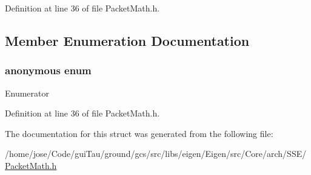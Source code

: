 Definition at line 36 of file Packet\-Math.\-h.



\subsection{Member Enumeration Documentation}
\hypertarget{structei__unpacket__traits_3_01____m128_01_4_aac7f4e6b9de23f90164c838116d0e04e}{\subsubsection[{anonymous enum}]{\setlength{\rightskip}{0pt plus 5cm}anonymous enum}}\label{structei__unpacket__traits_3_01____m128_01_4_aac7f4e6b9de23f90164c838116d0e04e}
\begin{Desc}
\item[Enumerator]\par
\begin{description}
\item[{\em 
\hypertarget{structei__unpacket__traits_3_01____m128_01_4_aac7f4e6b9de23f90164c838116d0e04ea8118586734f1b8635fd65d55aad37fc5}{size}\label{structei__unpacket__traits_3_01____m128_01_4_aac7f4e6b9de23f90164c838116d0e04ea8118586734f1b8635fd65d55aad37fc5}
}]\end{description}
\end{Desc}


Definition at line 36 of file Packet\-Math.\-h.



The documentation for this struct was generated from the following file\-:\begin{DoxyCompactItemize}
\item 
/home/jose/\-Code/gui\-Tau/ground/gcs/src/libs/eigen/\-Eigen/src/\-Core/arch/\-S\-S\-E/\hyperlink{_s_s_e_2_packet_math_8h}{Packet\-Math.\-h}\end{DoxyCompactItemize}
